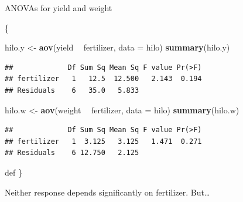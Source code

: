 \documentclass[ignorenonframetext,]{beamer}
\newenvironment{Shaded}{\begin{snugshade}}{\end{snugshade}}
\newcommand{\DataTypeTok}[1]{\textcolor[rgb]{0.13,0.29,0.53}{#1}}
\newcommand{\KeywordTok}[1]{\textcolor[rgb]{0.13,0.29,0.53}{\textbf{#1}}}
\newcommand{\NormalTok}[1]{#1}
\newcommand{\OperatorTok}[1]{\textcolor[rgb]{0.81,0.36,0.00}{\textbf{#1}}}
\newcommand{\StringTok}[1]{\textcolor[rgb]{0.31,0.60,0.02}{#1}}
\begin{document}
\begin{frame}[fragile]{ANOVAs for yield and weight}
\protect\hypertarget{anovas-for-yield-and-weight}{}

\{\small

\begin{Shaded}
\begin{Highlighting}[]
\NormalTok{hilo.y <-}\StringTok{ }\KeywordTok{aov}\NormalTok{(yield }\OperatorTok{~}\StringTok{ }\NormalTok{fertilizer, }\DataTypeTok{data =}\NormalTok{ hilo)}
\KeywordTok{summary}\NormalTok{(hilo.y)}
\end{Highlighting}
\end{Shaded}

\begin{verbatim}
##             Df Sum Sq Mean Sq F value Pr(>F)
## fertilizer   1   12.5  12.500   2.143  0.194
## Residuals    6   35.0   5.833
\end{verbatim}

\begin{Shaded}
\begin{Highlighting}[]
\NormalTok{hilo.w <-}\StringTok{ }\KeywordTok{aov}\NormalTok{(weight }\OperatorTok{~}\StringTok{ }\NormalTok{fertilizer, }\DataTypeTok{data =}\NormalTok{ hilo)}
\KeywordTok{summary}\NormalTok{(hilo.w)}
\end{Highlighting}
\end{Shaded}

\begin{verbatim}
##             Df Sum Sq Mean Sq F value Pr(>F)
## fertilizer   1  3.125   3.125   1.471  0.271
## Residuals    6 12.750   2.125
\end{verbatim}

def \}

Neither response depends significantly on fertilizer. But\ldots

\end{frame}
\end{document}
